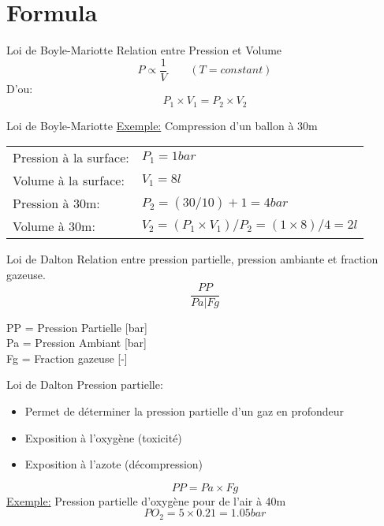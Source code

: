 
\section{Formula}

\begin{frame}{Loi de Boyle-Mariotte}
	Relation entre Pression et Volume\\
	\[	\boxed{ P \propto \frac{1}{V} \qquad (T=constant) } \]
	D'ou:
	\[ \boxed{ P_1 \times V_1 = P_2 \times V_2 } \]
\end{frame}

\begin{frame}{Loi de Boyle-Mariotte}  
	\underline{Exemple:} Compression d'un ballon à 30m
	\begin{tabularx}{\linewidth}{l X}
		Pression à la surface:	&	$P_1 = 1 bar$\\
		Volume à la surface:		&	$V_1 = 8l$\\
		Pression à 30m:			&	$P_2 = (30/10)+1 = 4 bar$\\
		Volume à 30m:				&	$V_2 = (P_1 \times V_1) / P_2 = (1 \times 8) / 4 = 2l$
	\end{tabularx}
\end{frame}

\begin{frame}{Loi de Dalton}  
	Relation entre pression partielle, pression ambiante et fraction gazeuse.\\
	\[ \boxed{ \dfrac{PP}{Pa \bigg| Fg} } \]
	
	PP = Pression Partielle [bar]\\
	Pa = Pression Ambiant [bar]\\
	Fg = Fraction gazeuse [-]	
\end{frame}

\begin{frame}{Loi de Dalton}
	Pression partielle:
	\begin{itemize}
		\item Permet de déterminer la pression partielle d'un gaz en profondeur
		\item Exposition à l'oxygène (toxicité)
		\item Exposition à l'azote (décompression)
	\end{itemize}
	\[ \boxed {PP = Pa \times Fg} \]
	\vfill
	\underline{Exemple:}	Pression partielle d'oxygène pour de l'air à 40m\\
	\[ PO_2 = 5 \times 0.21 = 1.05 bar\]
\end{frame}

